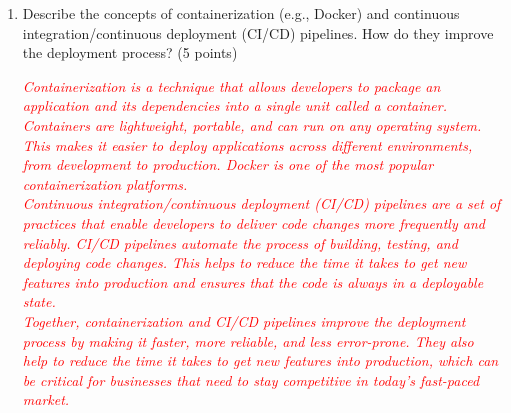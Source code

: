 \documentclass{article}
\begin{document}
\begin{enumerate}
\begin{itemize}
{            and your production environment that cause your application to behave differently.}
            \item \textit{Configuration Errors: Mistakes in your configuration could cause your application to behave incorrectly or not start at all.}
            \item \textit{Scaling Issues: If your application receives more traffic than expected, it might not be able to handle the load.}
            \item \textit{Security Issues: If your application or its dependencies have security vulnerabilities, they could be exploited by attackers.}
          \end{itemize}

          \item Describe the concepts of containerization (e.g., Docker) and continuous
          integration/continuous deployment (CI/CD) pipelines. How do they improve
          the deployment process? (5 points) \par
          \textcolor{red}{\textit{Containerization is a technique that allows developers to package an application and its 
          dependencies into a single unit called a container. Containers are lightweight, portable, and can run on any operating system.
           This makes it easier to deploy applications across different environments, from development to production. 
           Docker is one of the most popular containerization platforms.}}\\
           \textcolor{red}{\textit{Continuous integration/continuous deployment (CI/CD) pipelines are a set of practices that enable 
           developers to deliver code changes more frequently and reliably. CI/CD pipelines automate the process of building, testing, 
           and deploying code changes. This helps to reduce the time it takes to get new features into production and ensures 
           that the code is always in a deployable state.}}\\
           \textcolor{red}{\textit{Together, containerization and CI/CD pipelines improve the deployment process by making it faster,
            more reliable, and less error-prone. They also help to reduce the time it takes to get new features into production, 
            which can be critical for businesses that need to stay competitive in today’s fast-paced market.}}


\end{enumerate}
\end{document}
